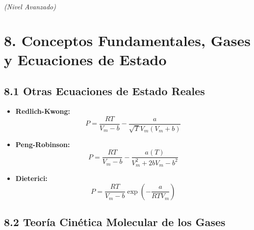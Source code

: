 \documentclass[11pt,a4paper]{article}
\begin{document}
\textit{(Nivel Avanzado)}

\section*{8. Conceptos Fundamentales, Gases y Ecuaciones de Estado}

\subsection*{8.1 Otras Ecuaciones de Estado Reales}

\begin{itemize}
  \item \textbf{Redlich-Kwong:}
  \[
    P = \frac{R T}{V_m - b} - \frac{a}{\sqrt{T} V_m (V_m + b)}
  \]
  \item \textbf{Peng-Robinson:}
  \[
    P = \frac{R T}{V_m - b} - \frac{a(T)}{V_m^2 + 2bV_m - b^2}
  \]
  \item \textbf{Dieterici:}
  \[
    P = \frac{R T}{V_m - b} \exp\left( -\frac{a}{R T V_m} \right)
  \]
\end{itemize}

\subsection*{8.2 Teoría Cinética Molecular de los Gases}
\end{document}
